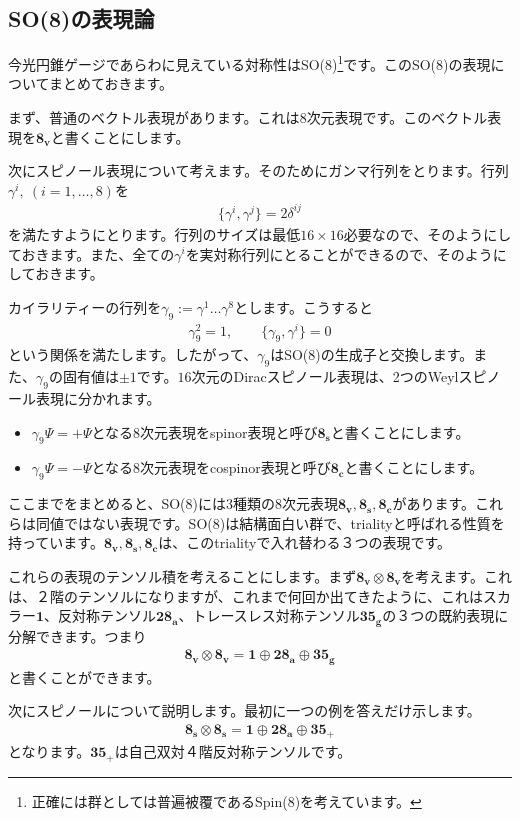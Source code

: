 \documentclass[report,paper=a4, fontsize=12pt, line_length=16cm, number_of_lines=34,dvipdfmx]{jlreq}
\numberwithin{equation}{chapter}
\numberwithin{equation}{section}
\newcommand{\triv}{\mathbf{1}}
\newcommand{\etv}{\mathbf{8_v}}
\newcommand{\ets}{\mathbf{8_s}}
\newcommand{\etc}{\mathbf{8_c}}
\newcommand{\tweta}{\mathbf{28_{a}}}
\newcommand{\thfvg}{\mathbf{35_{g}}}
\newcommand{\thfvp}{\mathbf{35}_{+}}
\begin{document}
\subsection{SO(8)の表現論}
今光円錐ゲージであらわに見えている対称性はSO(8)\footnote{正確には群としては普遍被覆であるSpin(8)を考えています。}です。このSO(8)の表現についてまとめておきます。

まず、普通のベクトル表現があります。これは$8$次元表現です。このベクトル表現を$\etv$と書くことにします。

次にスピノール表現について考えます。そのためにガンマ行列をとります。行列$\gamma^{i},\ (i=1,\dots,8)$を
\begin{align}
  \{\gamma^{i},\gamma^{j}\}=2\delta^{ij}
\end{align}
を満たすようにとります。行列のサイズは最低$16\times 16$必要なので、そのようにしておきます。また、全ての$\gamma^{i}$を実対称行列にとることができるので、そのようにしておきます。

カイラリティーの行列を$\gamma_9:=\gamma^{1}\dots \gamma^{8}$とします。こうすると
\begin{align}
  \gamma_9^{2}=1,\qquad \{\gamma_9,\gamma^{i}\}=0
\end{align}
という関係を満たします。したがって、$\gamma_9$はSO(8)の生成子と交換します。また、$\gamma_9$の固有値は$\pm 1$です。$16$次元のDiracスピノール表現は、2つのWeylスピノール表現に分かれます。
\begin{itemize}
  \item $\gamma_9\Psi = +\Psi$となる8次元表現をspinor表現と呼び$\ets$と書くことにします。
  \item $\gamma_9\Psi = -\Psi$となる8次元表現をcospinor表現と呼び$\etc$と書くことにします。
\end{itemize}

ここまでをまとめると、SO(8)には3種類の8次元表現$\etv,\ets,\etc$があります。これらは同値ではない表現です。SO(8)は結構面白い群で、trialityと呼ばれる性質を持っています。$\etv,\ets,\etc$は、このtrialityで入れ替わる３つの表現です。

これらの表現のテンソル積を考えることにします。まず$\etv\otimes\etv$を考えます。これは、２階のテンソルになりますが、これまで何回か出てきたように、これはスカラー$\triv$、反対称テンソル$\tweta$、トレースレス対称テンソル$\thfvg$の３つの既約表現に分解できます。つまり
\begin{align}
  \etv\otimes\etv=\triv \oplus \tweta\oplus \thfvg
\end{align}
と書くことができます。

次にスピノールについて説明します。最初に一つの例を答えだけ示します。
\begin{align}
  \ets\otimes\ets=\triv \oplus \tweta \oplus \thfvp
  \label{tensor8s8s}
\end{align}
となります。$\thfvp$は自己双対４階反対称テンソルです。
\end{document}
